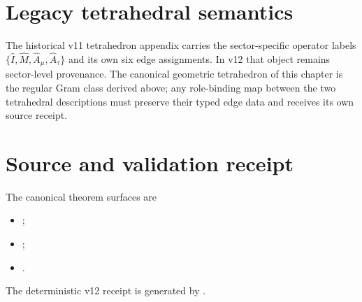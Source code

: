 \section{Legacy tetrahedral semantics}

The historical v11 tetrahedron appendix carries the sector-specific
operator labels
\(\{\hat I,\hat M,\hat A_\mu,\hat A_\tau\}\) and its own six edge assignments.
In v12 that object remains sector-level provenance.  The canonical geometric
tetrahedron of this chapter is the regular Gram class derived above; any
role-binding map between the two tetrahedral descriptions must preserve their
typed edge data and receives its own source receipt.

\section{Source and validation receipt}

The canonical theorem surfaces are
\begin{itemize}
\item {};
\item {};
\item {}.
\end{itemize}
The deterministic v12 receipt is generated by
.
